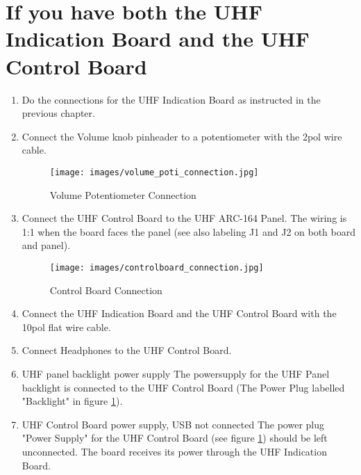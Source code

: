\documentclass[12pt, a4paper]{report}
\begin{document}
\section{If you have both the UHF Indication Board and the UHF Control Board}

\begin{enumerate}
\item
Do the connections for the UHF Indication Board as instructed in the previous chapter.
\item
Connect the Volume knob pinheader to a potentiometer with the 2pol wire cable. 


\begin{figure}[h!t]
\centering
\texttt{[image: images/volume\_poti\_connection.jpg]}
\caption{Volume Potentiometer Connection}
\label{fig:volPoti}
\end{figure}

\item
Connect the UHF Control Board to the UHF ARC-164 Panel. The wiring is 1:1 when the board faces the panel (see also labeling J1 and J2 on both board and panel).

\begin{figure}[h!t]
\centering
\texttt{[image: images/controlboard\_connection.jpg]}
\caption{Control Board Connection}
\label{fig:brdConn}
\end{figure}

\item
Connect the UHF Indication Board and the UHF Control Board with the 10pol flat wire cable.

\item
Connect Headphones to the UHF Control Board.
\item
UHF panel backlight power supply
The powersupply for the UHF Panel backlight is connected to the UHF Control Board (The Power Plug labelled "Backlight" in figure \ref{fig:volPoti}).

\item
UHF Control Board power supply, USB not connected
The power plug "Power Supply" for the UHF Control Board (see figure \ref{fig:volPoti}) should be left unconnected. The board receives its power through the UHF Indication Board.


\end{enumerate}
\end{document}
